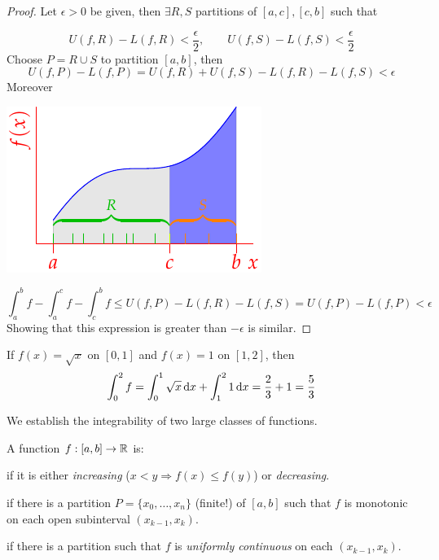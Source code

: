 \begin{proof}
	Let $\epsilon>0$ be given, then $\exists R,S$ partitions of $[a,c],[c,b]$ such that\par
	\begin{minipage}[t]{0.65\linewidth}\vspace{-10pt}
		\[
			U(f,R)-L(f,R)<\frac\epsilon 2,\qquad U(f,S)-L(f,S)<\frac\epsilon 2
		\]
		Choose $P=R\cup S$ to partition $[a,b]$, then
		\[
			U(f,P)-L(f,P)=U(f,R)+U(f,S)-L(f,R)-L(f,S)<\epsilon
		\]
		Moreover
	\end{minipage}
	\hfill
	\begin{minipage}[t]{0.34\linewidth}\vspace{0pt}
		\flushright\includegraphics[scale=0.95]{domain-split2}
	\end{minipage}\par
	\[
		\int_a^bf-\int_a^cf-\int_c^bf
		\le U(f,P)-L(f,R)-L(f,S)
		=U(f,P)-L(f,P)<\epsilon
	\]
	Showing that this expression is greater than $-\epsilon$ is similar.
\end{proof}


\goodbreak


\begin{example}{}{}
	If $f(x)=\sqrt x$ on $[0,1]$ and $f(x)=1$ on $[1,2]$, then
	\[
		\int_0^2f =\int_0^1\sqrt x\,{\mathrm{d} x}+\int_1^2 1\,{\mathrm{d} x}
		=\frac 23+1 =\frac 53
	\]
\end{example}



We establish the integrability of two large classes of functions.

\begin{defn}{}{}
	A function $f:[a,b]\to\mathbb{R}$ is:
	\begin{description}\itemsep1pt
		\item[\normalfont\emph{Monotonic}] if it is either \emph{increasing} ($x<y\Longrightarrow f(x)\le f(y)$) or \emph{decreasing}.
		\item[\normalfont\emph{Piecewise monotonic}] if there is a partition $P=\{x_0,\ldots,x_n\}$ (finite!) of $[a,b]$ such that $f$ is monotonic on each open subinterval $(x_{k-1},x_k)$.
		\item[\normalfont\emph{Piecewise continuous}] if there is a partition such that $f$ is \emph{uniformly continuous} on each $(x_{k-1},x_k)$.
	\end{description}
\end{defn}


